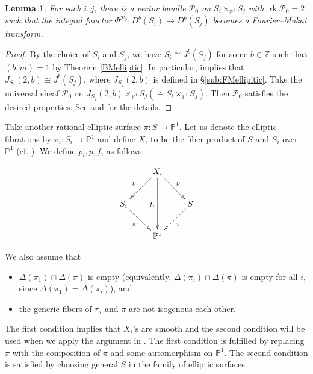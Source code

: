 \documentclass[a4paper,11pt]{article}
\newtheorem{lem}[thm]{Lemma}
\theoremstyle{definition}\newtheorem{defn}[thm]{Definition}
\theoremstyle{remark}\newtheorem{remark}[thm]{Remark}
\numberwithin{equation}{section}
\newcommand{\rk}{\ensuremath{\operatorname{rk}}}
\newcommand{\mc}{\mathcal}
\newcommand{\fm}[1]{\ensuremath{\Phi^{#1}}}
\newcommand{\PP}{\mathbb P}
\newcommand{\Z}{\mathbb Z}
\begin{document}

\begin{lem}\label{lem:rank2}
For each $i,j$,
there is a vector bundle $\mc P_0$ on $S_i\times _{\PP ^1}S_j$ with 
$\rk \mc P_0=2$
such that the integral functor  $\fm{\mc P_0}\colon D^b(S_i)\to D^b(S_j)$ becomes a
Fourier--Mukai transform.
\end{lem}
%
\begin{proof}
By the choice of $S_i$ and $S_j$, we have 
$S_i\cong J^b(S_j)$ for some $b\in \Z$ such that $(b,m)=1$ by Theorem \ref{BMelliptic}.
In particular, \cite[Lemma 4.2]{BM01} implies that 
$J_{S_j}(2,b)\cong J^b(S_j)$, where $J_{S_j}(2,b)$ is defined in \S \ref{sub:FMellipitic}.
Take the universal sheaf $\mc P_0$ on 
$J_{S_j}(2,b) \times _{\PP ^1}S_j (\cong S_i\times _{\PP ^1}S_j)$. Then 
$\mc P_0$ satisfies the desired properties. See \cite[\S 4]{BM01} 
and \cite{Br98} for the details.

\end{proof}


Take another rational  elliptic surface 
$\pi\colon S\to \PP^1$.
Let us denote the elliptic fibrations 
by $\pi_i\colon S_i\to \PP^1$ and define $X_i$ to be 
the fiber product of $S$ and $S_i$ over $\PP^1$ (cf. \cite{Sc88}). 
We define 
$p_i,p,f_i$ as follows.

\noindent
\[ \xymatrix{ & X_i \ar[dl]_{p_i} \ar[dr] ^{p} \ar[dd]_{f_i}&  \\
  S_i \ar[dr]_{\pi_i}&        & S\ar[dl]^{\pi} \\
     & \PP ^1 &  \\ 
}\]

\noindent
%
We also assume that 
%
\begin{itemize}%
\item
$\Delta(\pi_1)\cap \Delta(\pi)$ is empty (equivalently, 
$\Delta(\pi_i)\cap \Delta(\pi)$ is empty for all $i$, 
since $\Delta(\pi_1)=\Delta(\pi_i)$), and
\item
the generic fibers of $\pi_i$ and $\pi$ are not isogenous each other. 
\end{itemize}
%
The first condition implies that $X_i$'s are smooth
and the second condition will be used when 
we apply the argument in \cite{Na91}.
The first condition is fulfilled by replacing $\pi$ with
the composition of $\pi$ and some automorphism on $\PP^1$.
The second condition is satisfied by choosing general $S$ 
in the family of elliptic surfaces.
\end{document}
